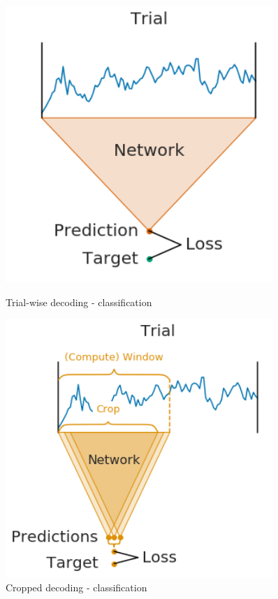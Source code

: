 \begin{figure}
    \centering
    \begin{minipage}{0.45\textwidth}
        \centering
        \includegraphics[width=0.9\textwidth]{img/ch3/trialwise-explanation} %
        \caption{Trial-wise decoding - classification}
    \end{minipage}\hfill
    \begin{minipage}{0.45\textwidth}
        \centering
        \includegraphics[width=0.9\textwidth]{img/ch3/trialwise-explanation2} %
        \caption{Cropped decoding - classification}
    \end{minipage}
\end{figure}\label{fig:trial-wise-decoding}

